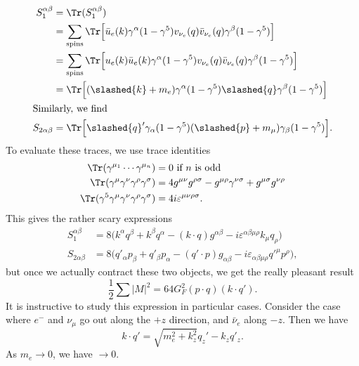 \documentclass[a4paper]{article}
\begin{document}
\begin{align*}
  S_1^{\alpha\beta} &= \Tr(S_1^{\alpha\beta}) \\
  &= \sum_{\mathrm{spins}} \Tr \Big[\bar{u}_e(k) \gamma^\alpha (1 - \gamma^5) v_{\nu_e}(q) \bar{v}_{\nu_e}(q) \gamma^\beta (1 - \gamma^5)\Big]\\
  &= \sum_{\mathrm{spins}} \Tr \Big[u_e(k)\bar{u}_e(k) \gamma^\alpha (1 - \gamma^5) v_{\nu_e}(q) \bar{v}_{\nu_e}(q) \gamma^\beta (1 - \gamma^5)\Big]\\
  &= \Tr \Big[(\slashed{k} + m_e) \gamma^\alpha (1 - \gamma^5) \slashed{q} \gamma^\beta(1 - \gamma^5)\Big]\\
  \intertext{Similarly, we find}
  S_{2\alpha\beta} &= \Tr \Big[\slashed{q}' \gamma_\alpha(1 - \gamma^5) (\slashed{p} + m_\mu) \gamma_\beta(1 - \gamma^5)\Big].
\end{align*}
To evaluate these traces, we use trace identities
\begin{align*}
  \Tr(\gamma^{\mu_1} \cdots \gamma^{\mu_n}) &= 0\text{ if $n$ is odd}\\
  \Tr(\gamma^\mu \gamma^\nu \gamma^\rho \gamma^\sigma) &= 4 g^{\mu\nu} g^{\rho\sigma} - g^{\mu\rho} \gamma^{\nu\sigma} + g^{\mu\sigma} g^{\nu\rho}\\
  \Tr(\gamma^5 \gamma^\mu \gamma^\nu \gamma^\rho \gamma^\sigma) &= 4i \varepsilon^{\mu\nu\rho\sigma}.
\end{align*}
This gives the rather scary expressions
\begin{align*}
  S_1^{\alpha\beta} &= 8\Big(k^\alpha q^\beta + k^\beta q^\alpha - (k\cdot q) g^{\alpha\beta} - i \varepsilon^{\alpha\beta\mu\rho} k_\mu q_\rho\Big)\\
  S_{2\alpha\beta} &= 8\Big(q'_\alpha p_\beta + q'_\beta p_\alpha - (q' \cdot p) g_{\alpha\beta} - i \varepsilon_{\alpha\beta\mu\rho} q'^\mu p^\rho\Big),
\end{align*}
but once we actually contract these two objects, we get the really pleasant result
\[
  \frac{1}{2} \sum |M|^2 = 64 G_F^2 (p \cdot q)(k \cdot q').
\]
It is instructive to study this expression in particular cases. Consider the case where $e^-$ and $\nu_\mu$ go out along the $+z$ direction, and $\bar{\nu}_e$ along $-z$. Then we have
\[
  k \cdot q' = \sqrt{m_e^2 + k_z^2} q_z' - k_z q'_z.
\]
As $m_e \to 0$, we have $\to 0$.
\end{document}
